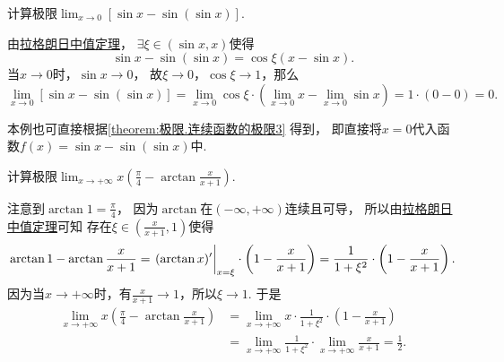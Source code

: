 \begin{example}
计算极限\(\lim_{x\to0} \left[\sin x - \sin(\sin x)\right]\).
\begin{solution}
由\hyperref[theorem:微分中值定理.拉格朗日中值定理]{拉格朗日中值定理}，
\(\exists\xi\in(\sin x,x)\)使得\[
	\sin x - \sin(\sin x)
	= \cos\xi (x-\sin x).
\]
当\(x\to0\)时，\(\sin x\to0\)，
故\(\xi\to0\)，\(\cos\xi\to1\)，那么\[
	\lim_{x\to0} \left[\sin x - \sin(\sin x)\right]
	= \lim_{x\to0} \cos\xi \cdot
		\left(\lim_{x\to0} x - \lim_{x\to0} \sin x\right)
	= 1 \cdot (0-0) = 0.
\]
\end{solution}
\end{example}
本例也可直接根据\cref{theorem:极限.连续函数的极限3} 得到，
即直接将\(x=0\)代入函数\(f(x) = \sin x - \sin(\sin x)\)中.
\begin{example}%
计算极限\(\lim_{x\to+\infty} x \left( \frac\pi4 - \arctan\frac{x}{x+1} \right)\).
\begin{solution}
注意到\(\arctan1 = \frac\pi4\)，
因为\(\arctan\)在\((-\infty,+\infty)\)连续且可导，
所以由\hyperref[theorem:微分中值定理.拉格朗日中值定理]{拉格朗日中值定理}可知
存在\(\xi\in\left( \frac{x}{x+1},1 \right)\)使得\[
	\arctan1 - \arctan\frac{x}{x+1}
	= \eval{(\arctan x)'}_{x=\xi} \cdot \left( 1 - \frac{x}{x+1} \right)
	= \frac1{1+\xi^2} \cdot \left( 1 - \frac{x}{x+1} \right).
\]
因为当\(x\to+\infty\)时，有\(\frac{x}{x+1} \to 1\)，所以\(\xi \to 1\).
于是\begin{align*}
	\lim_{x\to+\infty} x \left( \frac\pi4 - \arctan\frac{x}{x+1} \right)
	&= \lim_{x\to+\infty} x
		\cdot \frac1{1+\xi^2}
		\cdot \left( 1 - \frac{x}{x+1} \right) \\
	&= \lim_{x\to+\infty} \frac1{1+\xi^2}
		\cdot \lim_{x\to+\infty} \frac{x}{x+1}
	= \frac12.
\end{align*}
\end{solution}
\end{example}

